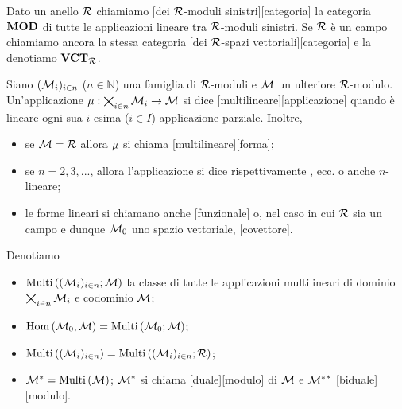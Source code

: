 \begin{Definition}
	Dato un anello $\mathcal{R}$ chiamiamo [dei $\mathcal{R}$-moduli sinistri][categoria] la categoria $\mathbf{MOD}$ di tutte le applicazioni lineare tra $\mathcal{R}$-moduli sinistri. Se $\mathcal{R}$ \`e un campo chiamiamo ancora la stessa categoria [dei $\mathcal{R}$-spazi vettoriali][categoria] e la denotiamo $\mathbf{VCT}_{\mathcal{R}}$.
\end{Definition}
\begin{Definition}
	Siano $(\mathcal{M}_i)_{i \in n}$ ($n \in \mathbb{N}$) una famiglia di $\mathcal{R}$-moduli e
	$\mathcal{M}$ un ulteriore $\mathcal{R}$-modulo. Un'applicazione
	$\mu: \bigtimes_{i \in n} \mathcal{M}_i \rightarrow \mathcal{M}$ si
	dice [multilineare][applicazione] quando \`e
	lineare ogni sua $i$-esima ($i \in I$) applicazione parziale.
	Inoltre,
	\begin{itemize}
		\item se $\mathcal{M} = \mathcal{R}$ allora $\mu$ si chiama
		[multilineare][forma];
		\item se $n = 2, 3, ...$, allora l'applicazione si dice
		rispettivamente ,
		 ecc. o anche $n$-lineare;
		\item le forme lineari si chiamano anche
		[funzionale] o, nel caso in cui $\mathcal{R}$ sia un campo e dunque $\mathcal{M}_0$ uno spazio vettoriale, [covettore].
	\end{itemize}
	Denotiamo
	\begin{itemize}
		\item $\text{Multi}\left ( (\mathcal{M}_i)_{i \in n} ; \mathcal{M} \right )$ la classe di tutte le applicazioni multilineari di dominio $\bigtimes_{i \in n} \mathcal{M}_i$ e codominio $\mathcal{M}$;
		\item $\text{Hom}\left ( \mathcal{M}_0, \mathcal{M} \right ) = \text{Multi}\left ( \mathcal{M}_0 ; \mathcal{M} \right )$;
		\item $\text{Multi}\left ( (\mathcal{M}_i)_{i \in n} \right ) = \text{Multi}\left ( (\mathcal{M}_i)_{i \in n} ; \mathcal{R} \right )$;
		\item ${{\mathcal{M}}^*} = \text{Multi}\left ( \mathcal{M} \right )$; ${{\mathcal{M}}^*}$ si chiama [duale][modulo] di $\mathcal{M}$ e ${{{{\mathcal{M}}^*}}^*}$ [biduale][modulo].
	\end{itemize}
\end{Definition}
